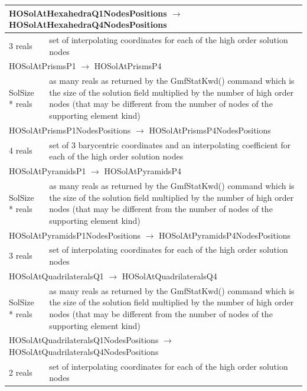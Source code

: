 \documentclass[a4paper,12pt]{article}
\begin{document}
\begin{longtable}{|m{4cm}|m{11cm}|}
\multicolumn{2}{|l|}{HOSolAtHexahedraQ1NodesPositions $\rightarrow$ HOSolAtHexahedraQ4NodesPositions} \\
\hline
3 reals & set of interpolating coordinates for each of the high order solution nodes \\
\hline\hline

\multicolumn{2}{|l|}{HOSolAtPrismsP1 $\rightarrow$ HOSolAtPrismsP4} \\
\hline
SolSize * reals & as many reals as returned by the GmfStatKwd() command which is the size of the solution field multiplied by the number of high order nodes (that may be different from the number of nodes of the supporting element kind)\\
\hline\hline

\multicolumn{2}{|l|}{HOSolAtPrismsP1NodesPositions $\rightarrow$ HOSolAtPrismsP4NodesPositions} \\
\hline
4 reals & set of 3 barycentric coordinates and an interpolating coefficient for each of the high order solution nodes \\
\hline\hline

\multicolumn{2}{|l|}{HOSolAtPyramidsP1 $\rightarrow$ HOSolAtPyramidsP4} \\
\hline
SolSize * reals & as many reals as returned by the GmfStatKwd() command which is the size of the solution field multiplied by the number of high order nodes (that may be different from the number of nodes of the supporting element kind)\\
\hline\hline

\multicolumn{2}{|l|}{HOSolAtPyramidsP1NodesPositions $\rightarrow$ HOSolAtPyramidsP4NodesPositions} \\
\hline
3 reals & set of interpolating coordinates for each of the high order solution nodes \\
\hline\hline

\multicolumn{2}{|l|}{HOSolAtQuadrilateralsQ1 $\rightarrow$ HOSolAtQuadrilateralsQ4} \\
\hline
SolSize * reals & as many reals as returned by the GmfStatKwd() command which is the size of the solution field multiplied by the number of high order nodes (that may be different from the number of nodes of the supporting element kind)\\
\hline\hline

\multicolumn{2}{|l|}{HOSolAtQuadrilateralsQ1NodesPositions $\rightarrow$ HOSolAtQuadrilateralsQ4NodesPositions} \\
\hline
2 reals & set of interpolating coordinates for each of the high order solution nodes \\
\hline\hline


\end{longtable}
\end{document}
